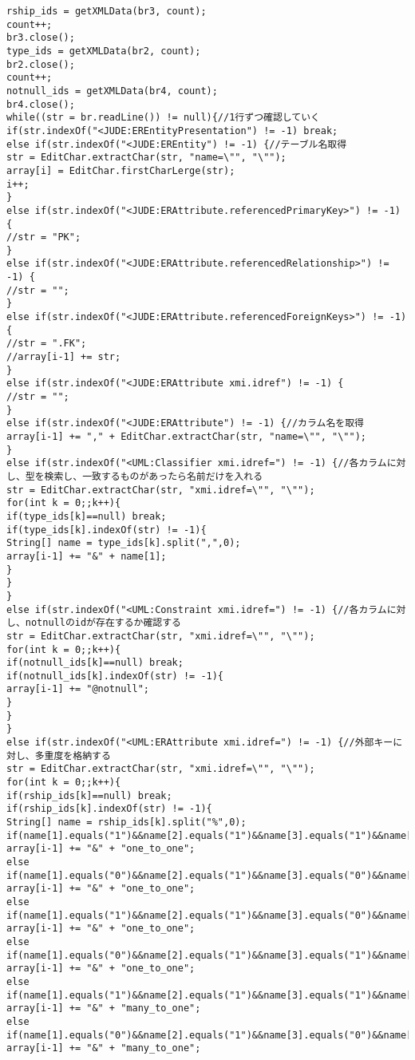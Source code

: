 \documentclass{funthesis}
\begin{document}
\begin{lstlisting}[caption=LoadER.java,label=1]
rship_ids = getXMLData(br3, count);
count++;
br3.close();
type_ids = getXMLData(br2, count);
br2.close();
count++;
notnull_ids = getXMLData(br4, count);
br4.close();
while((str = br.readLine()) != null){//1行ずつ確認していく
if(str.indexOf("<JUDE:EREntityPresentation") != -1) break;
else if(str.indexOf("<JUDE:EREntity") != -1) {//テーブル名取得
str = EditChar.extractChar(str, "name=\"", "\"");
array[i] = EditChar.firstCharLerge(str);
i++;
}
else if(str.indexOf("<JUDE:ERAttribute.referencedPrimaryKey>") != -1) {
//str = "PK";
}
else if(str.indexOf("<JUDE:ERAttribute.referencedRelationship>") != -1) {
//str = "";
}
else if(str.indexOf("<JUDE:ERAttribute.referencedForeignKeys>") != -1) {
//str = ".FK";
//array[i-1] += str;
}
else if(str.indexOf("<JUDE:ERAttribute xmi.idref") != -1) {
//str = "";
}
else if(str.indexOf("<JUDE:ERAttribute") != -1) {//カラム名を取得
array[i-1] += "," + EditChar.extractChar(str, "name=\"", "\"");
}
else if(str.indexOf("<UML:Classifier xmi.idref=") != -1) {//各カラムに対し、型を検索し、一致するものがあったら名前だけを入れる
str = EditChar.extractChar(str, "xmi.idref=\"", "\"");
for(int k = 0;;k++){
if(type_ids[k]==null) break;
if(type_ids[k].indexOf(str) != -1){
String[] name = type_ids[k].split(",",0);
array[i-1] += "&" + name[1];
}
}
}
else if(str.indexOf("<UML:Constraint xmi.idref=") != -1) {//各カラムに対し、notnullのidが存在するか確認する
str = EditChar.extractChar(str, "xmi.idref=\"", "\"");
for(int k = 0;;k++){
if(notnull_ids[k]==null) break;
if(notnull_ids[k].indexOf(str) != -1){
array[i-1] += "@notnull";
}
}
}
else if(str.indexOf("<UML:ERAttribute xmi.idref=") != -1) {//外部キーに対し、多重度を格納する
str = EditChar.extractChar(str, "xmi.idref=\"", "\"");
for(int k = 0;;k++){
if(rship_ids[k]==null) break;
if(rship_ids[k].indexOf(str) != -1){
String[] name = rship_ids[k].split("%",0);
if(name[1].equals("1")&&name[2].equals("1")&&name[3].equals("1")&&name[4].equals("1")) array[i-1] += "&" + "one_to_one";
else if(name[1].equals("0")&&name[2].equals("1")&&name[3].equals("0")&&name[4].equals("1")) array[i-1] += "&" + "one_to_one";
else if(name[1].equals("1")&&name[2].equals("1")&&name[3].equals("0")&&name[4].equals("1")) array[i-1] += "&" + "one_to_one";
else if(name[1].equals("0")&&name[2].equals("1")&&name[3].equals("1")&&name[4].equals("1")) array[i-1] += "&" + "one_to_one";
else if(name[1].equals("1")&&name[2].equals("1")&&name[3].equals("1")&&name[4].equals("-1")) array[i-1] += "&" + "many_to_one";
else if(name[1].equals("0")&&name[2].equals("1")&&name[3].equals("0")&&name[4].equals("-1")) array[i-1] += "&" + "many_to_one";

\end{lstlisting}
\end{document}

